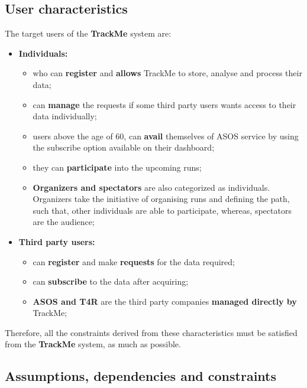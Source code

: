 \documentclass[12pt]{article}
\begin{document}
\subsection{User characteristics}
The target users of the \textbf{TrackMe} system are:
\begin{itemize}
\item{} \textbf{Individuals:} 
\begin{itemize}
\item{} who can \textbf{register} and \textbf{allows} TrackMe to store, analyse and process their data;
\item{} can \textbf{manage} the requests if some third party users wants access to their data individually;
\item{} users above the age of 60, can \textbf{avail} themselves of ASOS service by using the subscribe option available on their dashboard;
\item{} they can \textbf{participate} into the upcoming runs;
\item{} \textbf{Organizers and spectators} are also categorized as individuals. Organizers take the initiative of organising runs and defining the path, such that, other individuals are able to participate, whereas, spectators are the audience;

\end{itemize}
\item{} \textbf{Third party users:}
\begin{itemize}
\item{} can \textbf{register} and make \textbf{requests} for the data required;
\item{} can \textbf{subscribe} to the data after acquiring;
\item{} \textbf{ASOS and T4R} are the third party companies \textbf{managed directly by} TrackMe;
\end{itemize}
\end{itemize}

Therefore, all the constraints derived from these characteristics must be satisfied from the \textbf{TrackMe} system, as much as possible.

\subsection{Assumptions, dependencies and constraints}
\end{document}
